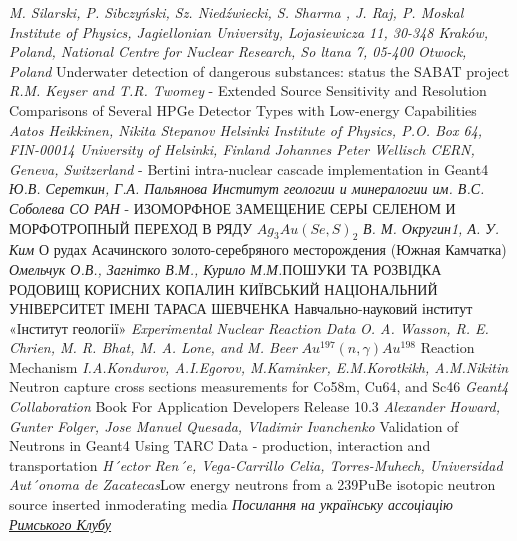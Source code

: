 \documentclass[a4paper, 14pt]{article}
\numberwithin{equation}{section}
\numberwithin{table}{section}
\begin{document}
\begin{thebibliography}{}
	
	\textit{M. Silarski, P. Sibczyński, Sz. Niedźwiecki, S. Sharma , J. Raj, P. Moskal Institute of Physics, Jagiellonian University, Lojasiewicza 11, 30-348 Kraków, Poland, National Centre for Nuclear Research, So ltana 7, 05-400 Otwock, Poland } Underwater detection of dangerous substances: status the
	SABAT project \label{lit:sabat}
	 \textit{R.M. Keyser and T.R. Twomey} - Extended Source Sensitivity and Resolution Comparisons of Several HPGe Detector Types with Low-energy Capabilities 
	 \textit{Aatos Heikkinen, Nikita Stepanov Helsinki Institute of Physics, P.O. Box 64, FIN-00014 University of Helsinki, Finland Johannes Peter Wellisch CERN, Geneva, Switzerland} - Bertini intra-nuclear cascade implementation in Geant4 
	 \textit{Ю.В. Сереткин, Г.А. Пальянова Институт геологии и минералогии им. В.С. Соболева СО РАН} - ИЗОМОРФНОЕ ЗАМЕЩЕНИЕ СЕРЫ СЕЛЕНОМ И МОРФОТРОПНЫЙ ПЕРЕХОД В РЯДУ $Ag_3Au(Se,S)_2$ 	
	 \textit{В. М. Округин1, А. У. Ким} О рудах Асачинского золото-серебряного месторождения
	(Южная Камчатка)
	 \textit{Омельчук О.В., Загнітко В.М., Курило М.М.}ПОШУКИ ТА РОЗВІДКА РОДОВИЩ КОРИСНИХ КОПАЛИН КИЇВСЬКИЙ НАЦІОНАЛЬНИЙ УНІВЕРСИТЕТ ІМЕНІ ТАРАСА ШЕВЧЕНКА Навчально-науковий інститут «Інститут геології»
	 \textit{Experimental Nuclear Reaction Data}
	 \textit{O. A. Wasson, R. E. Chrien, M. R. Bhat, M. A. Lone, and M. Beer} $Au^{197}(n, \gamma)Au^{198}$ Reaction Mechanism 
	 \textit{	I.A.Kondurov, A.I.Egorov, M.Kaminker, E.M.Korotkikh, A.M.Nikitin}  Neutron capture cross sections measurements for Co58m, Cu64, and Sc46
	 \textit{ Geant4 Collaboration } Book For Application Developers
	Release 10.3
	 \textit{ Alexander Howard, Gunter Folger, Jose Manuel Quesada, Vladimir Ivanchenko} Validation of Neutrons in Geant4 Using TARC Data - production, interaction and transportation \label{lit:tarc}
	 \textit{H´ector Ren´e, Vega-Carrillo Celia, Torres-Muhech, Universidad Aut´onoma de Zacatecas}Low energy neutrons from a 239PuBe isotopic neutron source inserted inmoderating media
	 \textit{Посилання на українську ассоціацію \href{http://www.clubofrome.org.ua/}{Римського Клубу}} \label{lit:romeClub}
	
\end{thebibliography}
	
\end{document}
